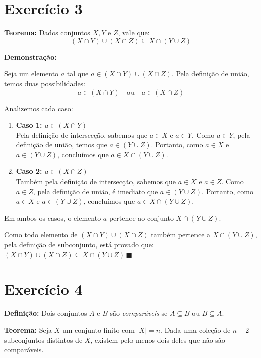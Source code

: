 \documentclass[11pt,reqno,a4paper]{amsart}
\begin{document}
\newpage
\section*{Exercício 3}

\textbf{Teorema:} Dados conjuntos $X, Y$ e $Z$, vale que:
\[ (X \cap Y) \cup (X \cap Z) \subseteq X \cap (Y \cup Z) \]

\textbf{Demonstração:}

Seja um elemento $a$ tal que $a \in (X \cap Y) \cup (X \cap Z)$. Pela definição de união, temos duas possibilidades:
\[ a \in (X \cap Y) \quad \text{ou} \quad a \in (X \cap Z) \]

Analizemos cada caso:

\begin{enumerate}
    \item \textbf{Caso 1: $a \in (X \cap Y)$} \\
    Pela definição de intersecção, sabemos que $a \in X$ e $a \in Y$. 
    Como $a \in Y$, pela definição de união, temos que $a \in (Y \cup Z)$. 
    Portanto, como $a \in X$ e $a \in (Y \cup Z)$, concluímos que $a \in X \cap (Y \cup Z)$.

    \item \textbf{Caso 2: $a \in (X \cap Z)$} \\
    Também pela definição de intersecção, sabemos que $a \in X$ e $a \in Z$. 
    Como $a \in Z$, pela definição de união, é imediato que $a \in (Y \cup Z)$. 
    Portanto, como $a \in X$ e $a \in (Y \cup Z)$, concluímos que $a \in X \cap (Y \cup Z)$.
\end{enumerate}

Em ambos os casos, o elemento $a$ pertence ao conjunto $X \cap (Y \cup Z)$. 

Como todo elemento de $(X \cap Y) \cup (X \cap Z)$ também pertence a $X \cap (Y \cup Z)$, pela definição de subconjunto, está provado que:
$(X \cap Y) \cup (X \cap Z) \subseteq X \cap (Y \cup Z)\,\blacksquare$

\newpage 
\section*{Exercício 4}

\textbf{Definição:} Dois conjuntos $A$ e $B$ são \textit{comparáveis} se $A \subseteq B$ ou $B \subseteq A$.

\textbf{Teorema:} Seja $X$ um conjunto finito com $|X| = n$. Dada uma coleção de $n+2$ subconjuntos distintos de $X$, existem pelo menos dois deles que não são comparáveis.
\end{document}
